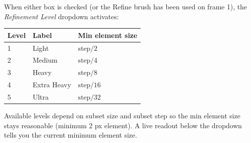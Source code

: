 When either box is checked (or the Refine brush has been used on
frame 1), the \emph{Refinement Level} dropdown activates:

\begin{center}
\begin{tabular}{lll}
  \toprule
  Level & Label & Min element size \\
  \midrule
  1 & Light        & $\text{step} / 2$ \\
  2 & Medium       & $\text{step} / 4$ \\
  3 & Heavy        & $\text{step} / 8$ \\
  4 & Extra Heavy  & $\text{step} / 16$ \\
  5 & Ultra        & $\text{step} / 32$ \\
  \bottomrule
\end{tabular}
\end{center}

Available levels depend on subset size and subset step so the min
element size stays reasonable (minimum 2 px element). A live readout
below the dropdown tells you the current minimum element size.

